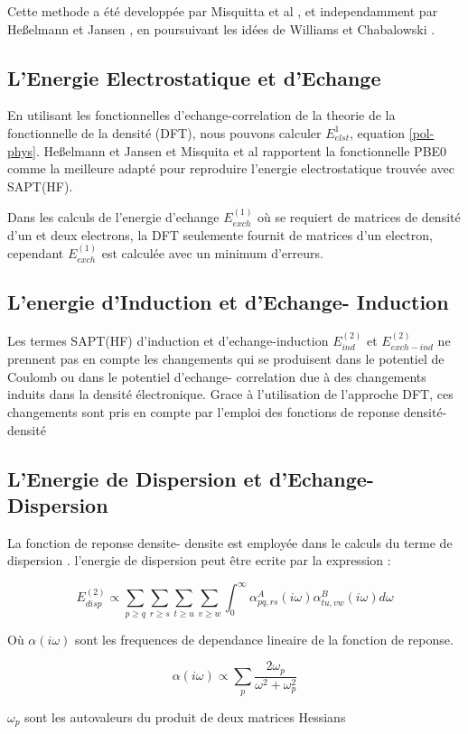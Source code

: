 Cette methode a été developpée par Misquitta et al \cite{misquitta2005intermolecular}, et independamment par Heßelmann et Jansen \cite{hesselmann2002first}, en poursuivant les idées de Williams et Chabalowski \cite{williams2001using}. 

\subsection{L'Energie Electrostatique et d'Echange }

En utilisant les fonctionnelles d'echange-correlation de la theorie de la fonctionnelle de la densité (DFT), nous pouvons calculer $E_{elst}^{1}$, equation \ref{pol-phys}. Heßelmann et Jansen \cite{hesselmann2002first} et Misquita et al \cite{misquitta2005symmetry} rapportent la fonctionnelle PBE0 comme la meilleure adapté pour reproduire l'energie electrostatique trouvée avec SAPT(HF). 

Dans les calculs de l'energie d'echange $E_{exch}^{(1)}$ où se requiert de matrices de densité d'un et deux electrons, la DFT seulemente fournit de matrices d'un electron, cependant $E_{exch}^{(1)}$ est calculée avec un minimum d'erreurs. 

\subsection{L'energie d'Induction et d'Echange- Induction}

Les termes SAPT(HF) d'induction et d'echange-induction $E_{ind}^{(2)}$ et $E_{exch-ind}^{(2)}$ ne prennent pas en compte les changements qui se produisent dans le potentiel de Coulomb ou dans le potentiel d'echange- correlation due à des changements induits dans la densité électronique. Grace à l'utilisation de l'approche DFT, ces changements sont pris en compte par l'emploi des fonctions de reponse densité- densité \cite{jansen2001comment}

\subsection{L'Energie de Dispersion et d'Echange- Dispersion}

La fonction de reponse densite- densite est employée dans le calculs du terme de dispersion \cite{hesselmann2003intermolecular}. l'energie de dispersion peut être ecrite par la expression :

\begin{equation}
E_{disp}^{(2)} \propto \sum_{p\geq q} \sum_{r\geq s} \sum_{t\geq u} \sum_{v\geq w} \int_{0}^{\infty} \alpha_{pq,rs}^{A} (i\omega) \alpha_{tu,vw}^{B} (i\omega) d\omega
\end{equation}
 
 Où $\alpha(i\omega)$ sont les frequences de dependance lineaire de la fonction de reponse. 
 
 \begin{equation}
 \alpha(i\omega) \propto \sum_{p} \frac{2\omega_{p}}{\omega^{2} + \omega_{p}^{2}}  \label{ome}
 \end{equation}
 
 $\omega_{p}$ sont les autovaleurs du produit de deux matrices Hessians 